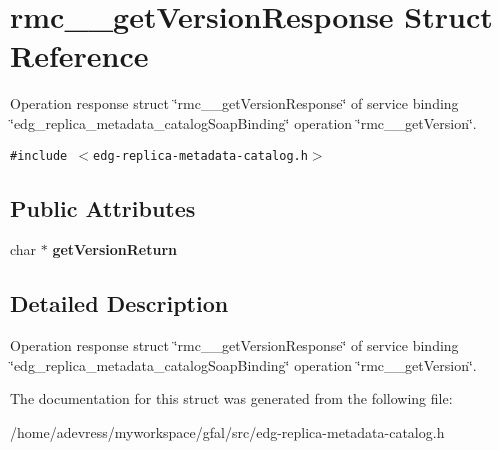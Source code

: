 \section{rmc\_\-\_\-get\-Version\-Response Struct Reference}
\label{structrmc____getVersionResponse}
Operation response struct \char`\"{}rmc\_\-\_\-get\-Version\-Response\char`\"{} of service binding \char`\"{}edg\_\-replica\_\-metadata\_\-catalog\-Soap\-Binding\char`\"{} operation \char`\"{}rmc\_\-\_\-get\-Version\char`\"{}.  


{\tt \#include $<$edg-replica-metadata-catalog.h$>$}

\subsection*{Public Attributes}
\begin{CompactItemize}
\item 
char $\ast$ \textbf{get\-Version\-Return}\label{structrmc____getVersionResponse_4829a72afe5bcfd930b9f6aee9580913}

\end{CompactItemize}


\subsection{Detailed Description}
Operation response struct \char`\"{}rmc\_\-\_\-get\-Version\-Response\char`\"{} of service binding \char`\"{}edg\_\-replica\_\-metadata\_\-catalog\-Soap\-Binding\char`\"{} operation \char`\"{}rmc\_\-\_\-get\-Version\char`\"{}. 



The documentation for this struct was generated from the following file:\begin{CompactItemize}
\item 
/home/adevress/myworkspace/gfal/src/edg-replica-metadata-catalog.h\end{CompactItemize}
